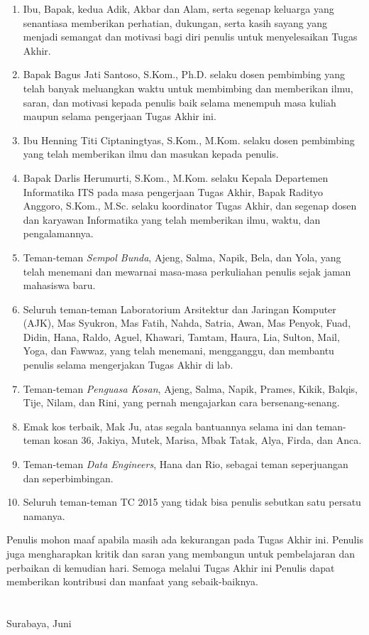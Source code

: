 \begin{enumerate}
	\item Ibu, Bapak, kedua Adik, Akbar dan Alam, serta segenap keluarga yang senantiasa memberikan perhatian, dukungan, serta kasih sayang yang menjadi semangat dan motivasi bagi diri penulis untuk menyelesaikan Tugas Akhir.
	\item Bapak Bagus Jati Santoso, S.Kom., Ph.D. selaku dosen pembimbing yang telah banyak meluangkan waktu untuk membimbing dan memberikan ilmu, saran, dan motivasi kepada penulis baik selama menempuh masa kuliah maupun selama pengerjaan Tugas Akhir ini.
	\item Ibu Henning Titi Ciptaningtyas, S.Kom., M.Kom. selaku dosen pembimbing yang telah memberikan ilmu dan masukan kepada penulis.
	\item Bapak Darlis Herumurti, S.Kom., M.Kom. selaku Kepala Departemen Informatika ITS pada masa pengerjaan Tugas Akhir, Bapak Radityo Anggoro, S.Kom., M.Sc. selaku koordinator Tugas Akhir, dan segenap dosen dan karyawan Informatika yang telah memberikan ilmu, waktu, dan pengalamannya.
	\item Teman-teman \textit{Sempol Bunda}, Ajeng, Salma, Napik, Bela, dan Yola, yang telah menemani dan mewarnai masa-masa perkuliahan penulis sejak jaman mahasiswa baru.
	\item Seluruh teman-teman Laboratorium Arsitektur dan Jaringan Komputer (AJK), Mas Syukron, Mas Fatih, Nahda, Satria, Awan, Mas Penyok, Fuad, Didin, Hana, Raldo, Aguel, Khawari, Tamtam, Haura, Lia, Sulton, Mail, Yoga, dan Fawwaz, yang telah menemani, mengganggu, dan membantu penulis selama mengerjakan Tugas Akhir di lab.
	\item Teman-teman \textit{Penguasa Kosan}, Ajeng, Salma, Napik, Prames, Kikik, Balqis, Tije, Nilam, dan Rini, yang pernah mengajarkan cara bersenang-senang. 
	\item Emak kos terbaik, Mak Ju, atas segala bantuannya selama ini dan teman-teman kosan 36, Jakiya, Mutek, Marisa, Mbak Tatak, Alya, Firda, dan Anca.
	\item Teman-teman \textit{Data Engineers}, Hana dan Rio, sebagai teman seperjuangan dan seperbimbingan.
	\item Seluruh teman-teman TC 2015 yang tidak bisa penulis sebutkan satu persatu namanya.
\end{enumerate}

Penulis mohon maaf apabila masih ada kekurangan pada Tugas Akhir ini. Penulis juga mengharapkan kritik dan saran yang membangun untuk pembelajaran dan perbaikan di kemudian hari. Semoga melalui Tugas Akhir ini Penulis dapat memberikan kontribusi dan manfaat yang sebaik-baiknya. \\ \\ \\

\hfill Surabaya, Juni \tahun \\ \\ \\

\hfill \penulis \\
\cleardoublepage
